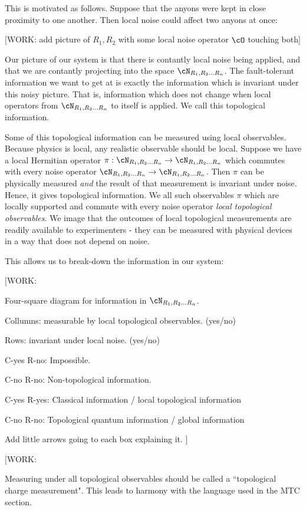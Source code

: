 This is motivated as follows. Suppose that the anyons were kept in close proximity to one another. Then local noise could affect two anyons at once:

[WORK: add picture of $R_1,R_2$ with some local noise operator $\cO$ touching both]

Our picture of our system is that there is contantly local noise being applied, and that we are contantly projecting into the space $\cN_{R_1,R_2... R_n}$. The fault-tolerant information we want to get at is exactly the information which is invariant under this noisy picture. That is, information which does not change when local operators from $\cN_{R_1,R_2... R_n}$ to itself is applied. We call this topological information.

Some of this topological information can be measured using local observables. Because physics is local, any realistic observable should be local. Suppose we have a local Hermitian operator $\pi: \cN_{R_1,R_2... R_n}\to \cN_{R_1,R_2... R_n}$ which commutes with every noise operator $\cN_{R_1,R_2... R_n}\to \cN_{R_1,R_2... R_n}$. Then $\pi$ can be physically measured \textit{and} the result of that measurement is invariant under noise. Hence, it gives topological information. We all such observables $\pi$ which are locally supported and commute with every noise operator \textit{local topological observables}. We image that the outcomes of local topological measurements are readily available to experimenters - they can be measured with physical devices in a way that does not depend on noise.

This allows us to break-down the information in our system:

[WORK:

Four-square diagram for information in $\cN_{R_1,R_2... R_n}$.

Collumns: measurable by local topological observables. (yes/no)

Rows: invariant under local noise. (yes/no)

C-yes R-no: Impossible.

C-no R-no: Non-topological information.

C-yes R-yes: Classical information / local topological information

C-no R-no: Topological quantum information / global information 

Add little arrows going to each box explaining it.
]


[WORK:

Measuring under all topological observables should be called a ``topological charge measurement". This leads to harmony with the language used in the MTC section.

